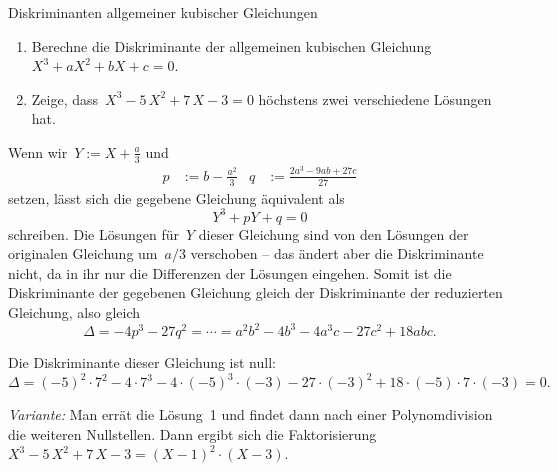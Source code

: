 \documentclass{algblatt}
\begin{document}
\begin{aufgabe}{Diskriminanten allgemeiner kubischer Gleichungen}
\begin{enumerate}
\item Berechne die Diskriminante der allgemeinen kubischen Gleichung
$X^3 + a X^2 + b X + c = 0$.
\item Zeige, dass~$X^3 - 5\,X^2 + 7\,X - 3 = 0$ höchstens zwei verschiedene
Lösungen hat.
\end{enumerate}

\begin{loesungE}
\item Wenn wir~$Y := X + \frac{a}{3}$ und
\begin{align*}
  p &:= b - \frac{a^2}{3} &
  q &:= \frac{2a^3 - 9ab + 27c}{27}
\end{align*}
setzen, lässt sich die gegebene Gleichung äquivalent als
\[ Y^3 + pY + q = 0 \]
schreiben. Die Lösungen für~$Y$ dieser Gleichung sind von den Lösungen der
originalen Gleichung um~$a/3$ verschoben -- das ändert aber die Diskriminante
nicht, da in ihr nur die Differenzen der Lösungen eingehen. Somit ist die
Diskriminante der gegebenen Gleichung gleich der Diskriminante der reduzierten
Gleichung, also gleich
\[ \Delta = -4p^3 - 27q^2 = \cdots = a^2b^2 - 4b^3 - 4a^3c - 27c^2 + 18abc. \]

\item Die Diskriminante dieser Gleichung ist null:
\[ \Delta = (-5)^2 \cdot 7^2 - 4 \cdot 7^3 - 4 \cdot (-5)^3 \cdot (-3) - 27 \cdot
(-3)^2 + 18\cdot(-5)\cdot7\cdot(-3) = 0. \]

\emph{Variante:} Man errät die Lösung~1 und findet dann nach einer
Polynomdivision die weiteren Nullstellen. Dann ergibt sich die
Faktorisierung~$X^3 - 5\,X^2 + 7\,X - 3 = (X-1)^2 \cdot (X-3)$.
\end{loesungE}
\end{aufgabe}
\end{document}
